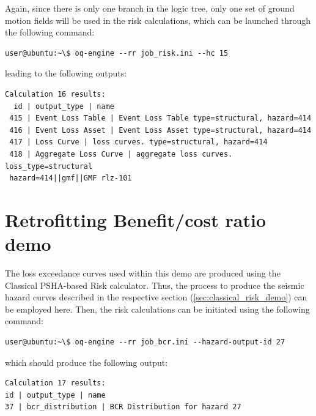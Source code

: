 Again, since there is only one branch in the logic tree, only one set of ground motion fields will be used in the risk calculations, which can be launched through the following command:

\begin{Verbatim}[frame=single, commandchars=\\\{\}, samepage=true]
user@ubuntu:~\$ oq-engine --rr job_risk.ini --hc 15
\end{Verbatim}

leading to the following outputs:

\begin{Verbatim}[frame=single, commandchars=\\\{\}, samepage=true]
Calculation 16 results:
  id | output_type | name
 415 | Event Loss Table | Event Loss Table type=structural, hazard=414
 416 | Event Loss Asset | Event Loss Asset type=structural, hazard=414
 417 | Loss Curve | loss curves. type=structural, hazard=414
 418 | Aggregate Loss Curve | aggregate loss curves. loss_type=structural 
 hazard=414||gmf||GMF rlz-101
\end{Verbatim}

\section{Retrofitting Benefit/cost ratio demo}
The loss exceedance curves used within this demo are produced using the Classical PSHA-based Risk calculator. Thus, the process to produce the seismic hazard curves described in the respective section (\ref{sec:classical_risk_demo}) can be employed here. Then, the risk calculations can be initiated using the following command:

\begin{Verbatim}[frame=single, commandchars=\\\{\}, samepage=true]
user@ubuntu:~\$ oq-engine --rr job_bcr.ini --hazard-output-id 27
\end{Verbatim}

which should produce the following output:

\begin{Verbatim}[frame=single, commandchars=\\\{\}, samepage=true]
Calculation 17 results:
id | output_type | name
37 | bcr_distribution | BCR Distribution for hazard 27
\end{Verbatim}